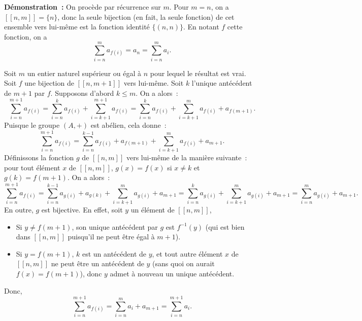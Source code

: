 \medskip

\noindent\textbf{Démonstration :} 
    On procède par récurrence sur $m$. 
    Pour $m = n$, on a $[\![n, m]\!] = \lbrace n \rbrace$, donc la seule bijection (en fait, la seule fonction) de cet ensemble vers lui-même est la fonction identité $\lbrace (n, n) \rbrace$. 
    En notant $f$ cette fonction, on a 
    \begin{equation*}
        \sum_{i=n}^m a_{f(i)} = a_n = \sum_{i=n}^m a_i.
    \end{equation*}

    Soit $m$ un entier naturel supérieur ou égal à $n$ pour lequel le résultat est vrai.
    Soit $f$ une bijection de $[\![n, m+1]\!]$ vers lui-même.
    Soit $k$ l'unique antécédent de $m+1$ par $f$.
    Supposons d'abord $k \leq m$.
    On a alors : 
    \begin{equation*}
        \sum_{i=n}^{m+1} a_{f(i)}
        = \sum_{i=n}^k a_{f(i)} + \sum_{i=k+1}^{m+1} a_{f(i)}
        = \sum_{i=n}^k a_{f(i)} + \sum_{i=k+1}^m a_{f(i)} + a_{f(m+1)}.
    \end{equation*}
    Puisque le groupe $(A, +)$ est abélien, cela donne : 
    \begin{equation*}
        \sum_{i=n}^{m+1} a_{f(i)}
        = \sum_{i=n}^{k-1} a_{f(i)} + a_{f(m+1)} + \sum_{i=k+1}^m a_{f(i)} + a_{m+1} .
    \end{equation*}
    Définissons la fonction $g$ de $[\![n, m]\!]$ vers lui-même de la manière suivante : pour tout élément $x$ de $[\![n, m]\!]$, $g(x) = f(x)$ si $x \neq k$ et $g(k) = f(m+1)$. 
    On a alors : 
    \begin{equation*}
        \sum_{i=n}^{m+1} a_{f(i)}
        = \sum_{i=n}^{k-1} a_{g(i)} + a_{g(k)} + \sum_{i=k+1}^m a_{g(i)} + a_{m+1} 
        = \sum_{i=n}^k a_{g(i)} + \sum_{i=k+1}^m a_{g(i)} + a_{m+1} 
        = \sum_{i=n}^m a_{g(i)} + a_{m+1} .
    \end{equation*}
    En outre, $g$ est bijective. 
    En effet, soit $y$ un élément de $[\![n, m]\!]$, 
    \begin{itemize}[nosep]
        \item Si $y \neq f(m+1)$, son unique antécédent par $g$ est $f^{-1}(y)$ (qui est bien dans $[\![n, m]\!]$ puisqu'il ne peut être égal à $m+1$).
        \item Si $y = f(m+1)$, $k$ est un antécédent de $y$, et tout autre élément $x$ de $[\![n, m]\!]$ ne peut être un antécédent de $y$ (sans quoi on aurait $f(x) = f(m+1)$), donc $y$ admet à nouveau un unique antécédent.
    \end{itemize}
    Donc, 
    \begin{equation*}
        \sum_{i=n}^{m+1} a_{f(i)}
        = \sum_{i=n}^m a_{i} + a_{m+1} 
        = \sum_{i=n}^{m+1} a_{i} .
    \end{equation*}

